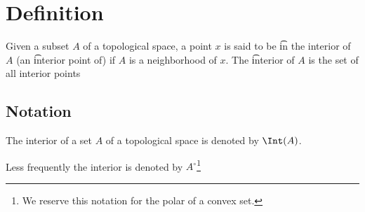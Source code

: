 
\section*{Definition}

Given a subset $A$ of a topological space, a point $x$ is said to be \t{in the interior of} $A$ (an \t{interior point of}) if $A$ is a neighborhood of $x$.
The \t{interior} of $A$ is the set of all interior points

\subsection*{Notation}

The interior of a set $A$ of a topological space is denoted by $\Int(A)$.

Less frequently the interior is denoted by $A^\circ$\footnote{We reserve this notation for the polar of a convex set.}

\blankpage
